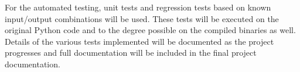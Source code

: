 For the automated testing, unit tests and regression tests based on known input/output combinations will be used.
These tests will be executed on the original Python code and to the degree possible on the compiled binaries as well.
Details of the various tests implemented will be documented as the project progresses and full documentation will be included in the final project documentation.

